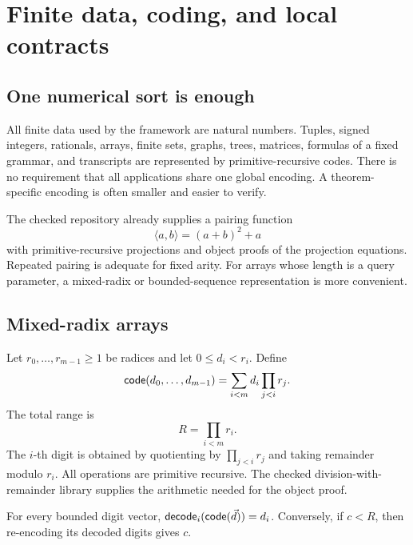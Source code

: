 \section{Finite data, coding, and local contracts}
\label{sec:finite-data}

\subsection{One numerical sort is enough}

All finite data used by the framework are natural numbers.  Tuples, signed integers, rationals, arrays, finite sets, graphs, trees, matrices, formulas of a fixed grammar, and transcripts are represented by primitive-recursive codes.  There is no requirement that all applications share one global encoding.  A theorem-specific encoding is often smaller and easier to verify.

The checked repository already supplies a pairing function
\[
  \langle a,b\rangle=(a+b)^2+a
\]
with primitive-recursive projections and object proofs of the projection equations.  Repeated pairing is adequate for fixed arity.  For arrays whose length is a query parameter, a mixed-radix or bounded-sequence representation is more convenient.

\subsection{Mixed-radix arrays}

Let \(r_0,\ldots,r_{m-1}\geq 1\) be radices and let \(0\leq d_i<r_i\).  Define
\begin{equation}
  \mathsf{code}(d_0,\ldots,d_{m-1})
  =\sum_{i<m} d_i\prod_{j<i}r_j.
  \label{eq:mixed-code}
\end{equation}
The total range is
\[
  R=\prod_{i<m}r_i.
\]
The \(i\)-th digit is obtained by quotienting by \(\prod_{j<i}r_j\) and taking remainder modulo \(r_i\).  All operations are primitive recursive.  The checked division-with-remainder library supplies the arithmetic needed for the object proof.

\begin{lemma}
For every bounded digit vector, \(\mathsf{decode}_i(\mathsf{code}(\vec d))=d_i\).  Conversely, if \(c<R\), then re-encoding its decoded digits gives \(c\).
\end{lemma}

